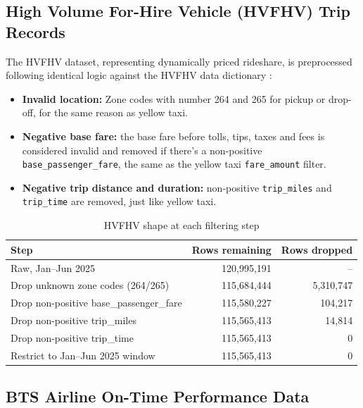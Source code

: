 \documentclass[11pt]{article}
\begin{document}
\FloatBarrier

\subsection{High Volume For-Hire Vehicle (HVFHV) Trip Records}

The HVFHV dataset, representing dynamically priced rideshare, is preprocessed following
identical logic against the HVFHV data dictionary \citep{tlc-hvfhs-dict}:

\begin{itemize}
  \item \textbf{Invalid location:} Zone codes with number 264 and 265 for pickup or
    drop-off, for the same reason as yellow taxi.
  \item \textbf{Negative base fare:} the base fare before tolls, tips, taxes and fees is
    considered invalid and removed if there's a non-positive
    \texttt{base\_passenger\_fare}, the same as the yellow taxi \texttt{fare\_amount}
    filter.
  \item \textbf{Negative trip distance and duration:} non-positive \texttt{trip\_miles}
    and \texttt{trip\_time} are removed, just like yellow taxi.
\end{itemize}

\begin{table}[h]
\centering
\caption{HVFHV shape at each filtering step}
\label{tab:hvfhv-shape}
\small
\begin{tabular}{lrr}
\toprule
Step & Rows remaining & Rows dropped \\
\midrule
Raw, Jan--Jun 2025 & 120,995,191 & -- \\
Drop unknown zone codes (264/265) & 115,684,444 & 5,310,747 \\
Drop non-positive base\_passenger\_fare & 115,580,227 & 104,217 \\
Drop non-positive trip\_miles & 115,565,413 & 14,814 \\
Drop non-positive trip\_time & 115,565,413 & 0 \\
Restrict to Jan--Jun 2025 window & 115,565,413 & 0 \\
\bottomrule
\end{tabular}
\end{table}

\FloatBarrier

\subsection{BTS Airline On-Time Performance Data}
\end{document}
